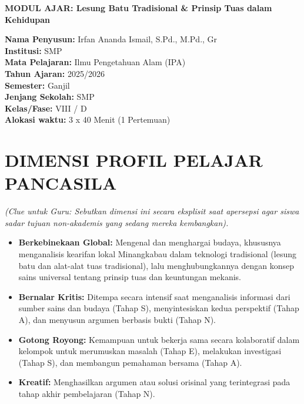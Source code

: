 \documentclass[a4paper,12pt]{article}
\begin{document}
\begin{center}
{\Large\textbf{MODUL AJAR: Lesung Batu Tradisional \& Prinsip Tuas dalam Kehidupan}}
\end{center}

\vspace{0.5cm}

\begin{tcolorbox}[mainbox]
\textbf{Nama Penyusun:} Irfan Ananda Ismail, S.Pd., M.Pd., Gr \\
\textbf{Institusi:} SMP \\
\textbf{Mata Pelajaran:} Ilmu Pengetahuan Alam (IPA) \\
\textbf{Tahun Ajaran:} 2025/2026 \\
\textbf{Semester:} Ganjil \\
\textbf{Jenjang Sekolah:} SMP \\
\textbf{Kelas/Fase:} VIII / D \\
\textbf{Alokasi waktu:} 3 x 40 Menit (1 Pertemuan)
\end{tcolorbox}

\section{DIMENSI PROFIL PELAJAR PANCASILA}
\textit{(Clue untuk Guru: Sebutkan dimensi ini secara eksplisit saat apersepsi agar siswa sadar tujuan non-akademis yang sedang mereka kembangkan).}

\begin{itemize}
\item \textbf{Berkebinekaan Global:} Mengenal dan menghargai budaya, khususnya menganalisis kearifan lokal Minangkabau dalam teknologi tradisional (lesung batu dan alat-alat tuas tradisional), lalu menghubungkannya dengan konsep sains universal tentang prinsip tuas dan keuntungan mekanis.
\item \textbf{Bernalar Kritis:} Ditempa secara intensif saat menganalisis informasi dari sumber sains dan budaya (Tahap S), menyintesiskan kedua perspektif (Tahap A), dan menyusun argumen berbasis bukti (Tahap N).
\item \textbf{Gotong Royong:} Kemampuan untuk bekerja sama secara kolaboratif dalam kelompok untuk merumuskan masalah (Tahap E), melakukan investigasi (Tahap S), dan membangun pemahaman bersama (Tahap A).
\item \textbf{Kreatif:} Menghasilkan argumen atau solusi orisinal yang terintegrasi pada tahap akhir pembelajaran (Tahap N).
\end{itemize}
\end{document}
